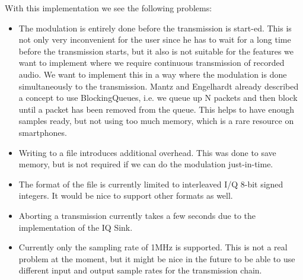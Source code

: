 \pagebreak
With this implementation we see the following problems: 
\begin{itemize}
	\item The modulation is entirely done before the transmission is start-ed. This is not only very inconvenient for the user since he has to wait for a long time before the transmission starts, but it also is not suitable for the features we want to implement where we require continuous transmission of recorded audio. We want to implement this in a way where the modulation is done simultaneously to the transmission. Mantz and Engelhardt \cite{Mantz2016} already described a concept to use BlockingQueues, i.e. we queue up N packets and then block until a packet has been removed from the queue. This helps to have enough samples ready, but not using too much memory, which is a rare resource on smartphones. 
	\item Writing to a file introduces additional overhead. This was done to save memory, but is not required if we can do the modulation just-in-time. 
	\item The format of the file is currently limited to interleaved I/Q 8-bit signed integers. It would be nice to support other formats as well. 
	\item Aborting a transmission currently takes a few seconds due to the implementation of the IQ Sink. 
	\item Currently only the sampling rate of 1MHz is supported. This is not a real problem at the moment, but it might be nice in the future to be able to use different input and output sample rates for the transmission chain.
\end{itemize}

